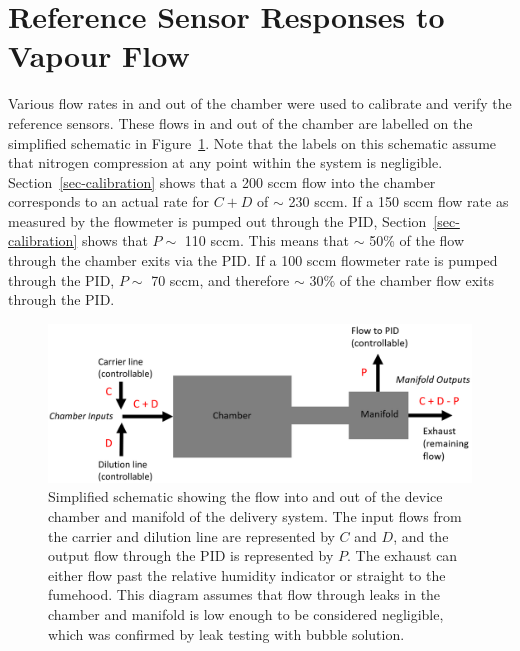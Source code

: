 \documentclass[
  a4paper,
]{scrbook}
\begin{document}
\hypertarget{sec-responses-to-vapour}{%
\section{Reference Sensor Responses to Vapour
Flow}\label{sec-responses-to-vapour}}

Various flow rates in and out of the chamber were used to calibrate and
verify the reference sensors. These flows in and out of the chamber are
labelled on the simplified schematic in
Figure~\ref{fig-chamber-schematic}. Note that the labels on this
schematic assume that nitrogen compression at any point within the
system is negligible. Section~\ref{sec-calibration} shows that a 200
sccm flow into the chamber corresponds to an actual rate for \(C + D\)
of \(\sim\) 230 sccm. If a 150 sccm flow rate as measured by the
flowmeter is pumped out through the PID, Section~\ref{sec-calibration}
shows that \(P \sim\) 110 sccm. This means that \(\sim\) 50\% of the
flow through the chamber exits via the PID. If a 100 sccm flowmeter rate
is pumped through the PID, \(P \sim\) 70 sccm, and therefore \(\sim\)
30\% of the chamber flow exits through the PID.

\begin{figure}

{\centering \includegraphics[width=1\textwidth,height=\textheight]{figures/ch9/chamber-manifold-v2.png}

}

\caption[Simplified schematic showing the flow into and out of the
device chamber and manifold of the delivery
system.]{\label{fig-chamber-schematic}Simplified schematic showing the
flow into and out of the device chamber and manifold of the delivery
system. The input flows from the carrier and dilution line are
represented by \(C\) and \(D\), and the output flow through the PID is
represented by \(P\). The exhaust can either flow past the relative
humidity indicator or straight to the fumehood. This diagram assumes
that flow through leaks in the chamber and manifold is low enough to be
considered negligible, which was confirmed by leak testing with bubble
solution.}

\end{figure}
\end{document}
